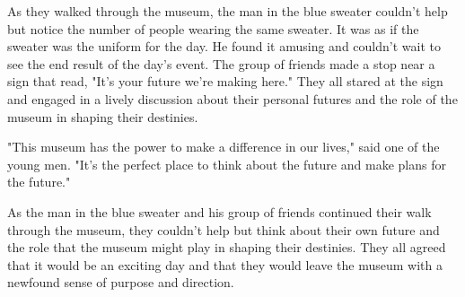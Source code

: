 \documentclass[smalldemyvopaper,11pt,twoside,onecolumn,openright,extrafontsizes]{memoir}
\begin{document}
As they walked through the museum, the man in the blue sweater couldn't help but notice the number of people wearing the same sweater. It was as if the sweater was the uniform for the day. He found it amusing and couldn't wait to see the end result of the day's event. The group of friends made a stop near a sign that read, "It's your future we're making here." They all stared at the sign and engaged in a lively discussion about their personal futures and the role of the museum in shaping their destinies.\par
"This museum has the power to make a difference in our lives," said one of the young men. "It's the perfect place to think about the future and make plans for the future."\par
As the man in the blue sweater and his group of friends continued their walk through the museum, they couldn't help but think about their own future and the role that the museum might play in shaping their destinies. They all agreed that it would be an exciting day and that they would leave the museum with a newfound sense of purpose and direction.\par
\end{document}
